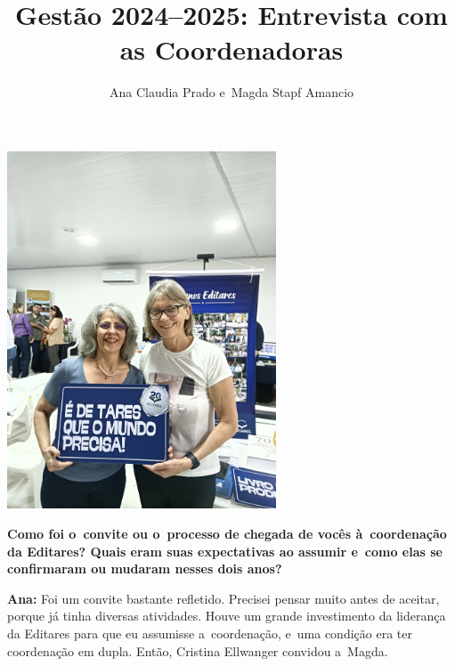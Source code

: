 \documentclass{gescons}
\author{Ana Claudia Prado e~Magda Stapf Amancio}
\title{Gestão 2024--2025: Entrevista com as Coordenadoras}
\begin{document}
    \makeentrevistatitle



    \begin{multicols}{2}


    \begin{center}
        \includegraphics[width=8cm,trim={100 0 100 1100},clip]{articles/resumo/fotos/materia2/IMG20241208144410.jpg}
    \end{center}



\textbf{Como foi o~convite ou o~processo de chegada de vocês à~coordenação da Editares? Quais eram suas expectativas ao assumir e~como elas se confirmaram ou mudaram nesses dois anos?}

\textbf{Ana:} Foi um convite bastante refletido. Precisei pensar muito antes de aceitar, porque já tinha diversas atividades. Houve um grande investimento da liderança da Editares para que eu assumisse a~coordenação, e~uma condição era ter coordenação em dupla. Então, Cristina Ellwanger convidou a~Magda.


\end{multicols}
\end{document}
